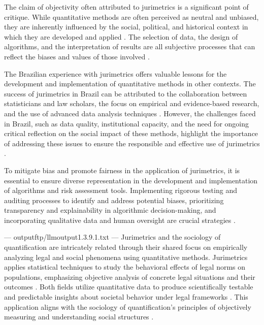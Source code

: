 The claim of objectivity often attributed to jurimetrics is a significant point of critique. While quantitative methods are often perceived as neutral and unbiased, they are inherently influenced by the social, political, and historical context in which they are developed and applied \cite{10.1057/s41599-020-00557-0}. The selection of data, the design of algorithms, and the interpretation of results are all subjective processes that can reflect the biases and values of those involved \cite{10.1057/s41599-020-00557-0}.

The Brazilian experience with jurimetrics offers valuable lessons for the development and implementation of quantitative methods in other contexts. The success of jurimetrics in Brazil can be attributed to the collaboration between statisticians and law scholars, the focus on empirical and evidence-based research, and the use of advanced data analysis techniques \cite{10.1007/s11186-021-09453-1,10.3390/fi9040068}. However, the challenges faced in Brazil, such as data quality, institutional capacity, and the need for ongoing critical reflection on the social impact of these methods, highlight the importance of addressing these issues to ensure the responsible and effective use of jurimetrics \cite{10.1007/s11186-021-09453-1,10.3390/fi9040068}.

To mitigate bias and promote fairness in the application of jurimetrics, it is essential to ensure diverse representation in the development and implementation of algorithms and risk assessment tools. Implementing rigorous testing and auditing processes to identify and address potential biases, prioritizing transparency and explainability in algorithmic decision-making, and incorporating qualitative data and human oversight are crucial strategies \cite{10.1057/s41599-020-00557-0,10.1590/15174522-105471}.


---
outputftp/llmoutput1.3.9.1.txt
---
Jurimetrics and the sociology of quantification are intricately related through their shared focus on empirically analyzing legal and social phenomena using quantitative methods. Jurimetrics applies statistical techniques to study the behavioral effects of legal norms on populations, emphasizing objective analysis of concrete legal situations and their outcomes \cite{nunes2018}. Both fields utilize quantitative data to produce scientifically testable and predictable insights about societal behavior under legal frameworks \cite{nunes2018, colombo2017}. This application aligns with the sociology of quantification's principles of objectively measuring and understanding social structures \cite{nunes2018, calvo2024}.

